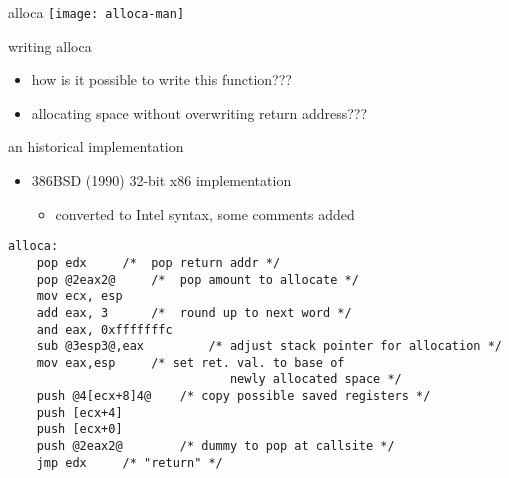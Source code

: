 \begin{frame}{alloca}
\texttt{[image: alloca-man]}
\end{frame}

\begin{frame}{writing alloca}
\begin{itemize}
\item how is it possible to write this function???
\item allocating space without overwriting return address???
\end{itemize}
\end{frame}

\begin{frame}[fragile,label=histBSDAlloca]{an historical implementation}
\begin{itemize}
\item 386BSD (1990) 32-bit x86 implementation
\begin{itemize}\item converted to Intel syntax, some comments added\end{itemize}
\end{itemize}
\begin{lstlisting}
alloca:
    pop edx		/*  pop return addr */
    pop @2eax2@		/*  pop amount to allocate */
    mov	ecx, esp
    add	eax, 3		/*  round up to next word */
    and eax, 0xfffffffc
    sub @3esp3@,eax         /* adjust stack pointer for allocation */
    mov	eax,esp 	/* set ret. val. to base of
                               newly allocated space */
    push @4[ecx+8]4@	/* copy possible saved registers */
    push [ecx+4]
    push [ecx+0]
    push @2eax2@		/* dummy to pop at callsite */
    jmp	edx		/* "return" */
\end{lstlisting}
\end{frame}

